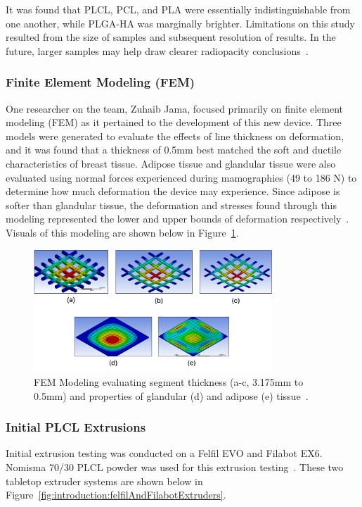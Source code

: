 It was found that PLCL, PCL, and PLA were essentially indistinguishable from one another, while PLGA-HA was marginally brighter. Limitations on this study resulted from the size of samples and subsequent resolution of results. In the future, larger samples may help draw clearer radiopacity conclusions~\cite{RefWorks:RefID:371-bakhtardesign}.

\subsubsection{Finite Element Modeling (FEM)\label{sec:introduction:priorWork:otherTeamWork:FEM}}

One researcher on the team, Zuhaib Jama, focused primarily on finite element modeling (FEM) as it pertained to the development of this new device. Three models were generated to evaluate the effects of line thickness on deformation, and it was found that a thickness of 0.5mm best matched the soft and ductile characteristics of breast tissue. Adipose tissue and glandular tissue were also evaluated using normal forces experienced during mamographies (49 to 186 N) to determine how much deformation the device may experience. Since adipose is softer than glandular tissue, the deformation and stresses found through this modeling represented the lower and upper bounds of deformation respectively~\cite{RefWorks:RefID:384-jamacomputational}. Visuals of this modeling are shown below in Figure~\ref{fig:introduction:femTesting}.

\begin{figure}[h!]
        \centering
        \includegraphics[width=0.8\textwidth]{../figs/introduction/fem_testing.png}
        \caption{FEM Modeling evaluating segment thickness (a-c, 3.175mm to 0.5mm) and properties of glandular (d) and adipose (e) tissue~\cite{RefWorks:RefID:384-jamacomputational}.}
        \label{fig:introduction:femTesting}
\end{figure}

\subsubsection{Initial PLCL Extrusions\label{sec:introduction:priorWork:otherTeamWork:plclExtrusions}}
Initial extrusion testing was conducted on a Felfil EVO and Filabot EX6. Nomisma 70/30 PLCL powder was used for this extrusion testing~\cite{RefWorks:RefID:387-nomisma}. These two tabletop extruder systems are shown below in Figure~\ref{fig:introduction:felfilAndFilabotExtruders}.

